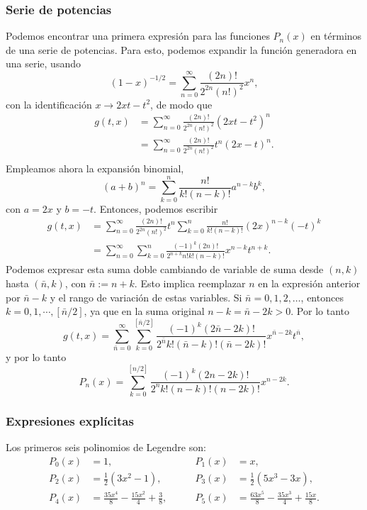 \subsubsection{Serie de potencias}
Podemos encontrar una primera expresión para las funciones $P_n(x)$ en términos de una serie de potencias. Para esto, podemos expandir la función generadora en una serie, usando
\begin{equation}
(1-x)^{-1/2}=\sum_{n=0}^\infty\frac{(2n)!}{2^{2n}(n!)^2}x^n,
\end{equation}
con la identificación $x\rightarrow 2xt-t^2$, de modo que
\begin{align}
g(t,x) &= \sum_{n=0}^\infty\frac{(2n)!}{2^{2n}(n!)^2}(2xt-t^2)^n \\
&= \sum_{n=0}^\infty\frac{(2n)!}{2^{2n}(n!)^2}t^n(2x-t)^n .\\
\end{align}
Empleamos ahora la expansión binomial,
\begin{equation}
(a+b)^n=\sum_{k=0}^n\frac{n!}{k!(n-k)!}a^{n-k}b^k,
\end{equation}
con $a=2x$ y $b=-t$. Entonces, podemos escribir
\begin{align}
g(t,x) 
&= \sum_{n=0}^\infty\frac{(2n)!}{2^{2n}(n!)^2}t^n \sum_{k=0}^n\frac{n!}{k!(n-k)!}(2x)^{n-k}(-t)^k\\
&= \sum_{n=0}^\infty\sum_{k=0}^n\frac{(-1)^k(2n)!}{2^{n+k}n!k!(n-k)!}x^{n-k}t^{n+k}.
\end{align}
Podemos expresar esta suma doble cambiando de variable de suma desde $(n,k)$ hasta $(\bar{n},k)$, con $\bar{n}:=n+k$. Esto implica reemplazar $n$ en la expresión anterior por $\bar{n}-k$ y el rango de variación de estas variables. Si $\bar{n}=0,1,2,\dots$, entonces $k=0,1,\cdots,[\bar{n}/2]$, ya que en la suma original $n-k=\bar{n}-2k>0$. Por lo tanto
\begin{equation}
g(t,x)= \sum_{\bar{n}=0}^\infty\sum_{k=0}^{[\bar{n}/2]}\frac{(-1)^k(2\bar{n}-2k)!}{2^{\bar{n}}k!(\bar{n}-k)!(\bar{n}-2k)!} x^{\bar{n}-2k}t^{\bar{n}},
\end{equation}
y por lo tanto
\begin{equation}\label{seriePn}
P_n(x)= \sum_{k=0}^{[n/2]}\frac{(-1)^{k}(2n-2k)!}{2^nk!(n-k)!(n-2k)!}x^{n-2k}.
\end{equation}

\subsubsection{Expresiones explícitas}
Los primeros seis polinomios de Legendre son:
 \begin{align*}
  P_0(x) &= 1, &P_1(x) &= x,\\
  P_2(x) &= \frac 12(3x^2-1), &P_3(x) &= \frac 12(5x^3-3x),\\
  P_4(x) &= \frac{35 x^{4}}{8} - \frac{15 x^{2}}{4} + \frac{3}{8}, \qquad 
  &P_5(x) &= \frac{63 x^{5}}{8} - \frac{35 x^{3}}{4} + \frac{15 x}{8}.
 \end{align*}
 
